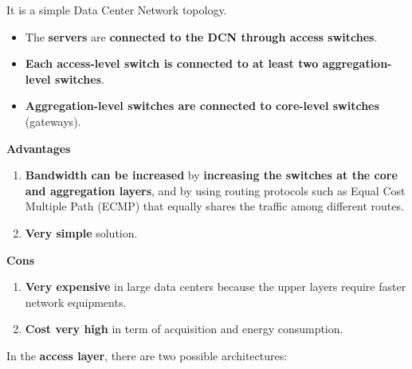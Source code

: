 \noindent
It is a simple Data Center Network topology. 
\begin{itemize}
    \item The \textbf{servers} are \textbf{connected to the DCN through access switches}.
    \item \textbf{Each access-level switch is connected to at least two aggregation-level switches}.
    \item \textbf{Aggregation-level switches are connected to core-level switches} (gateways).
\end{itemize}
\begin{flushleft}
    \textcolor{Green3}{ \textbf{Advantages}}
\end{flushleft}
\begin{enumerate}
    \item \textbf{Bandwidth can be increased} by \textbf{increasing the switches at the core and aggregation layers}, and by using routing protocols such as Equal Cost Multiple Path (ECMP) that equally shares the traffic among different routes.
    \item \textbf{Very simple} solution.
\end{enumerate}
\begin{flushleft}
    \textcolor{Red2}{ \textbf{Cons}}
\end{flushleft}
\begin{enumerate}
    \item \textbf{Very expensive} in large data centers because the upper layers require faster network equipments.
    \item \textbf{Cost very high} in term of acquisition and energy consumption.
\end{enumerate}
In the \textbf{access layer}, there are two possible architectures:
